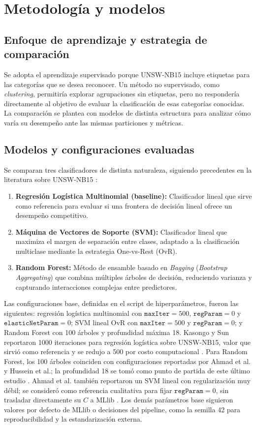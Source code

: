 \documentclass[conference]{IEEEtran}
\begin{document}
\section{Metodología y modelos}

\subsection{Enfoque de aprendizaje y estrategia de comparación}
Se adopta el aprendizaje supervisado porque UNSW-NB15 incluye etiquetas para las categorías que se desea reconocer. Un método no supervisado, como \textit{clustering}, permitiría explorar agrupaciones sin etiquetas, pero no respondería directamente al objetivo de evaluar la clasificación de esas categorías conocidas. La comparación se plantea con modelos de distinta estructura para analizar cómo varía su desempeño ante las mismas particiones y métricas.

\subsection{Modelos y configuraciones evaluadas}
Se comparan tres clasificadores de distinta naturaleza, siguiendo precedentes en la literatura sobre UNSW-NB15 \cite{more2024enhanced}:
\begin{enumerate}
    \item \textbf{Regresión Logística Multinomial (baseline):} Clasificador lineal que sirve como referencia para evaluar si una frontera de decisión lineal ofrece un desempeño competitivo.
    \item \textbf{Máquina de Vectores de Soporte (SVM):} Clasificador lineal que maximiza el margen de separación entre clases, adaptado a la clasificación multiclase mediante la estrategia One-vs-Rest (OvR).
    \item \textbf{Random Forest:} Método de ensamble basado en \textit{Bagging} (\textit{Bootstrap Aggregating}) que combina múltiples árboles de decisión, reduciendo varianza y capturando interacciones complejas entre predictores.
\end{enumerate}

Las configuraciones base, definidas en el script de hiperparámetros, fueron las siguientes: regresión logística multinomial con $\texttt{maxIter}=500$, $\texttt{regParam}=0$ y $\texttt{elasticNetParam}=0$; SVM lineal OvR con $\texttt{maxIter}=500$ y $\texttt{regParam}=0$; y Random Forest con 100 árboles y profundidad máxima 18. Kasongo y Sun reportaron 1000 iteraciones para regresión logística sobre UNSW-NB15, valor que sirvió como referencia y se redujo a 500 por costo computacional \cite{kasongo2020}. Para Random Forest, los 100 árboles coinciden con configuraciones reportadas por Ahmad et al. y Hussein et al.; la profundidad 18 se tomó como punto de partida de este último estudio \cite{ahmad2021,hussein2021}. Ahmad et al. también reportaron un SVM lineal con regularización muy débil; se consideró como referencia cualitativa para fijar $\texttt{regParam}=0$, sin trasladar directamente su $C$ a MLlib \cite{ahmad2021}. Los demás parámetros base siguieron valores por defecto de MLlib o decisiones del pipeline, como la semilla 42 para reproducibilidad y la estandarización externa.
\end{document}
